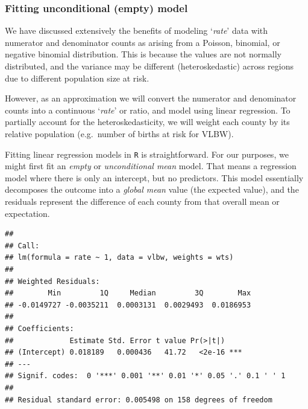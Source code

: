 \documentclass[
]{book}
\newenvironment{Shaded}{\begin{snugshade}}{\end{snugshade}}
\newcommand{\AttributeTok}[1]{\textcolor[rgb]{0.13,0.29,0.53}{#1}}
\newcommand{\CommentTok}[1]{\textcolor[rgb]{0.56,0.35,0.01}{\textit{#1}}}
\newcommand{\DecValTok}[1]{\textcolor[rgb]{0.00,0.00,0.81}{#1}}
\newcommand{\FunctionTok}[1]{\textcolor[rgb]{0.13,0.29,0.53}{\textbf{#1}}}
\newcommand{\NormalTok}[1]{#1}
\newcommand{\OtherTok}[1]{\textcolor[rgb]{0.56,0.35,0.01}{#1}}
\newcommand{\SpecialCharTok}[1]{\textcolor[rgb]{0.81,0.36,0.00}{\textbf{#1}}}
\begin{document}
\hypertarget{fitting-unconditional-empty-model}{%
\subsubsection{Fitting unconditional (empty) model}\label{fitting-unconditional-empty-model}}

We have discussed extensively the benefits of modeling `\emph{rate}' data with numerator and denominator counts as arising from a Poisson, binomial, or negative binomial distribution. This is because the values are not normally distributed, and the variance may be different (heteroskedastic) across regions due to different population size at risk.

However, as an approximation we will convert the numerator and denominator counts into a continuous `\emph{rate}' or ratio, and model using linear regression. To partially account for the heteroskedasticity, we will weight each county by its relative population (e.g.~number of births at risk for VLBW).

Fitting linear regression models in \texttt{R} is straightforward. For our purposes, we might first fit an \emph{empty} or \emph{unconditional mean} model. That means a regression model where there is only an intercept, but no predictors. This model essentially decomposes the outcome into a \emph{global mean} value (the expected value), and the residuals represent the difference of each county from that overall mean or expectation.

\begin{Shaded}
\end{Shaded}

\begin{verbatim}
## 
## Call:
## lm(formula = rate ~ 1, data = vlbw, weights = wts)
## 
## Weighted Residuals:
##        Min         1Q     Median         3Q        Max 
## -0.0149727 -0.0035211  0.0003131  0.0029493  0.0186953 
## 
## Coefficients:
##             Estimate Std. Error t value Pr(>|t|)    
## (Intercept) 0.018189   0.000436   41.72   <2e-16 ***
## ---
## Signif. codes:  0 '***' 0.001 '**' 0.01 '*' 0.05 '.' 0.1 ' ' 1
## 
## Residual standard error: 0.005498 on 158 degrees of freedom
\end{verbatim}
\end{document}
